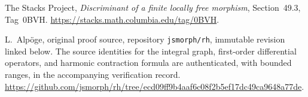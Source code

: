 The Stacks Project, \emph{Discriminant of a finite locally free morphism},
Section~49.3, Tag~0BVH.
\url{https://stacks.math.columbia.edu/tag/0BVH}.

L.~Alp\"oge, original proof source, repository \texttt{jsmorph/rh},
immutable revision linked below.
The source identities for the integral graph, first-order differential
operators, and harmonic contraction formula are authenticated, with
bounded ranges, in the accompanying verification record.
\url{https://github.com/jsmorph/rh/tree/ecd09ff9b4aaf6c08f2b5ef17dc49ca9648a77de}.
